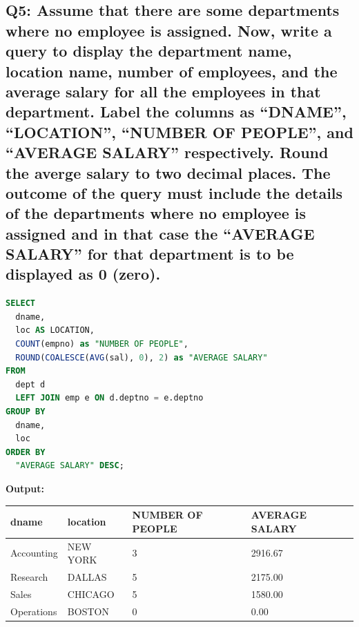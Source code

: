 \documentclass[11pt, a4paper]{article}
\begin{document}
\subsection*{Q5: Assume that there are some departments where no employee is assigned. Now, write
a query to display the department name, location name, number of employees, and the
average salary for all the employees in that department. Label the columns as
“DNAME”, “LOCATION”, “NUMBER OF PEOPLE”, and “AVERAGE SALARY”
respectively. Round the averge salary to two decimal places. The outcome of the
query must include the details of the departments where no employee is assigned and
in that case the “AVERAGE SALARY” for that department is to be displayed as 0
(zero).}
\begin{lstlisting}[language=SQL]
SELECT
  dname,
  loc AS LOCATION,
  COUNT(empno) as "NUMBER OF PEOPLE",
  ROUND(COALESCE(AVG(sal), 0), 2) as "AVERAGE SALARY"
FROM
  dept d
  LEFT JOIN emp e ON d.deptno = e.deptno
GROUP BY
  dname,
  loc
ORDER BY
  "AVERAGE SALARY" DESC;
\end{lstlisting}
\vspace{0.3cm}
\textbf{Output:}\vspace{0.2cm}
\begin{center}
\begin{tabular}{|l|l|l|l|}
\hline
\textbf{dname} & \textbf{location} & \textbf{NUMBER OF PEOPLE} & \textbf{AVERAGE SALARY} \\ \hline
Accounting & NEW YORK & 3 & 2916.67 \\ \hline
Research & DALLAS & 5 & 2175.00 \\ \hline
Sales & CHICAGO & 5 & 1580.00 \\ \hline
Operations & BOSTON & 0 & 0.00 \\ \hline
\end{tabular}
\end{center}
\newpage
\end{document}

